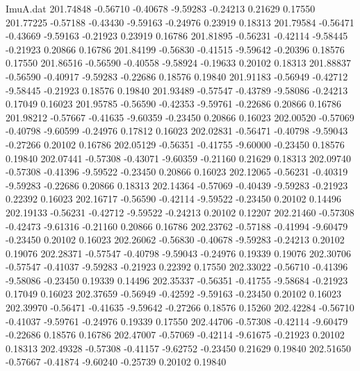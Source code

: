 \begin{filecontents}{ImuA.dat}
 201.74848   -0.56710   -0.40678   -9.59283   -0.24213    0.21629    0.17550
 201.77225   -0.57188   -0.43430   -9.59163   -0.24976    0.23919    0.18313
 201.79584   -0.56471   -0.43669   -9.59163   -0.21923    0.23919    0.16786
 201.81895   -0.56231   -0.42114   -9.58445   -0.21923    0.20866    0.16786
 201.84199   -0.56830   -0.41515   -9.59642   -0.20396    0.18576    0.17550
 201.86516   -0.56590   -0.40558   -9.58924   -0.19633    0.20102    0.18313
 201.88837   -0.56590   -0.40917   -9.59283   -0.22686    0.18576    0.19840
 201.91183   -0.56949   -0.42712   -9.58445   -0.21923    0.18576    0.19840
 201.93489   -0.57547   -0.43789   -9.58086   -0.24213    0.17049    0.16023
 201.95785   -0.56590   -0.42353   -9.59761   -0.22686    0.20866    0.16786
 201.98212   -0.57667   -0.41635   -9.60359   -0.23450    0.20866    0.16023
 202.00520   -0.57069   -0.40798   -9.60599   -0.24976    0.17812    0.16023
 202.02831   -0.56471   -0.40798   -9.59043   -0.27266    0.20102    0.16786
 202.05129   -0.56351   -0.41755   -9.60000   -0.23450    0.18576    0.19840
 202.07441   -0.57308   -0.43071   -9.60359   -0.21160    0.21629    0.18313
 202.09740   -0.57308   -0.41396   -9.59522   -0.23450    0.20866    0.16023
 202.12065   -0.56231   -0.40319   -9.59283   -0.22686    0.20866    0.18313
 202.14364   -0.57069   -0.40439   -9.59283   -0.21923    0.22392    0.16023
 202.16717   -0.56590   -0.42114   -9.59522   -0.23450    0.20102    0.14496
 202.19133   -0.56231   -0.42712   -9.59522   -0.24213    0.20102    0.12207
 202.21460   -0.57308   -0.42473   -9.61316   -0.21160    0.20866    0.16786
 202.23762   -0.57188   -0.41994   -9.60479   -0.23450    0.20102    0.16023
 202.26062   -0.56830   -0.40678   -9.59283   -0.24213    0.20102    0.19076
 202.28371   -0.57547   -0.40798   -9.59043   -0.24976    0.19339    0.19076
 202.30706   -0.57547   -0.41037   -9.59283   -0.21923    0.22392    0.17550
 202.33022   -0.56710   -0.41396   -9.58086   -0.23450    0.19339    0.14496
 202.35337   -0.56351   -0.41755   -9.58684   -0.21923    0.17049    0.16023
 202.37659   -0.56949   -0.42592   -9.59163   -0.23450    0.20102    0.16023
 202.39970   -0.56471   -0.41635   -9.59642   -0.27266    0.18576    0.15260
 202.42284   -0.56710   -0.41037   -9.59761   -0.24976    0.19339    0.17550
 202.44706   -0.57308   -0.42114   -9.60479   -0.22686    0.18576    0.16786
 202.47007   -0.57069   -0.42114   -9.61675   -0.21923    0.20102    0.18313
 202.49328   -0.57308   -0.41157   -9.62752   -0.23450    0.21629    0.19840
 202.51650   -0.57667   -0.41874   -9.60240   -0.25739    0.20102    0.19840

\end{filecontents}
